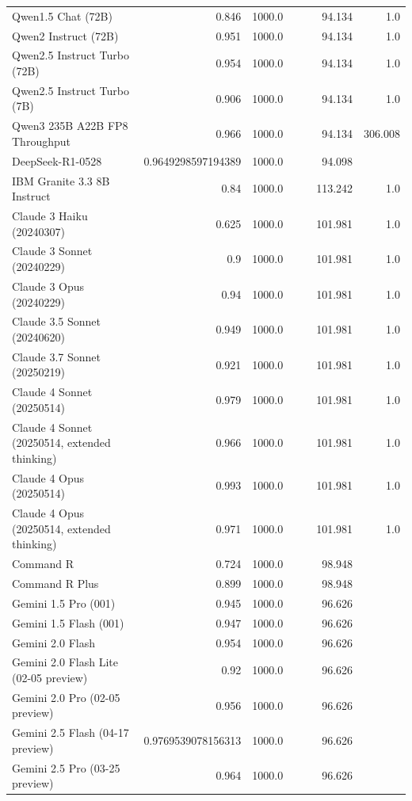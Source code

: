 \begin{table}[htp]
{\begin{tabular}{lrrrrrr}
Qwen1.5 Chat (72B) & 0.846 & 1000.0 &  &  & 94.134 & 1.0 \\
Qwen2 Instruct (72B) & 0.951 & 1000.0 &  &  & 94.134 & 1.0 \\
Qwen2.5 Instruct Turbo (72B) & 0.954 & 1000.0 &  &  & 94.134 & 1.0 \\
Qwen2.5 Instruct Turbo (7B) & 0.906 & 1000.0 &  &  & 94.134 & 1.0 \\
Qwen3 235B A22B FP8 Throughput & 0.966 & 1000.0 &  &  & 94.134 & 306.008 \\
DeepSeek-R1-0528 & 0.9649298597194389 & 1000.0 &  &  & 94.098 &  \\
IBM Granite 3.3 8B Instruct & 0.84 & 1000.0 &  &  & 113.242 & 1.0 \\
Claude 3 Haiku (20240307) & 0.625 & 1000.0 &  &  & 101.981 & 1.0 \\
Claude 3 Sonnet (20240229) & 0.9 & 1000.0 &  &  & 101.981 & 1.0 \\
Claude 3 Opus (20240229) & 0.94 & 1000.0 &  &  & 101.981 & 1.0 \\
Claude 3.5 Sonnet (20240620) & 0.949 & 1000.0 &  &  & 101.981 & 1.0 \\
Claude 3.7 Sonnet (20250219) & 0.921 & 1000.0 &  &  & 101.981 & 1.0 \\
Claude 4 Sonnet (20250514) & 0.979 & 1000.0 &  &  & 101.981 & 1.0 \\
Claude 4 Sonnet (20250514, extended thinking) & 0.966 & 1000.0 &  &  & 101.981 & 1.0 \\
Claude 4 Opus (20250514) & 0.993 & 1000.0 &  &  & 101.981 & 1.0 \\
Claude 4 Opus (20250514, extended thinking) & 0.971 & 1000.0 &  &  & 101.981 & 1.0 \\
Command R & 0.724 & 1000.0 &  &  & 98.948 &  \\
Command R Plus & 0.899 & 1000.0 &  &  & 98.948 &  \\
Gemini 1.5 Pro (001) & 0.945 & 1000.0 &  &  & 96.626 &  \\
Gemini 1.5 Flash (001) & 0.947 & 1000.0 &  &  & 96.626 &  \\
Gemini 2.0 Flash & 0.954 & 1000.0 &  &  & 96.626 &  \\
Gemini 2.0 Flash Lite (02-05 preview) & 0.92 & 1000.0 &  &  & 96.626 &  \\
Gemini 2.0 Pro (02-05 preview) & 0.956 & 1000.0 &  &  & 96.626 &  \\
Gemini 2.5 Flash (04-17 preview) & 0.9769539078156313 & 1000.0 &  &  & 96.626 &  \\
Gemini 2.5 Pro (03-25 preview) & 0.964 & 1000.0 &  &  & 96.626 &  \\

\end{tabular}}
\end{table}
